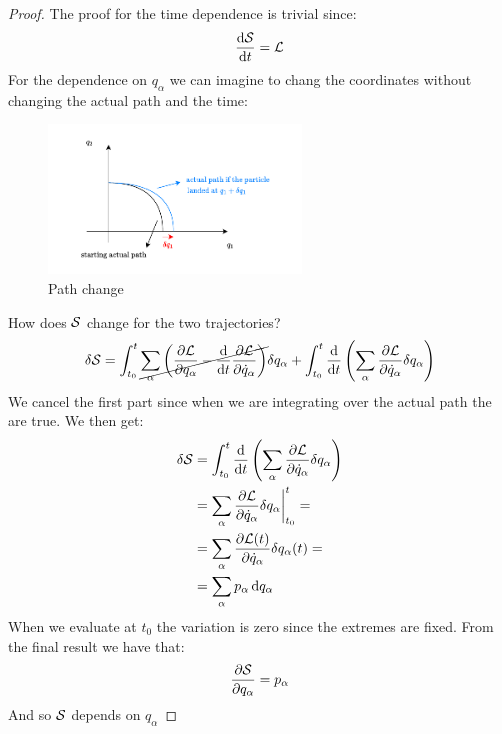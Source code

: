 \begin{proof}
  The proof for the time dependence is trivial since:
  \begin{equation}
    \dv{\action}{t} = \lagr
  \end{equation}
  For the dependence on $q_{\alpha}$ we can imagine to chang the coordinates without changing the actual path and the time:
  \begin{figure}[H]
    \centering
    \includegraphics[width=0.6\textwidth]{res/svg/path_change_hamjac.drawio}
    \caption{Path change}
\end{figure}
How does $\mathcal{S}$ change for the two trajectories?
\begin{equation}
  \delta \action = \int_{t_0}^{t}\cancel{\bigsum_{\alpha}\brackets{\pdv{\lagr}{q_{\alpha}}-\dv{}{t}\pdv{\lagr}{\dot{q}_{\alpha}}}}\delta q_{\alpha} + \int_{t_0}^{t} \dv{}{t} \brackets{\bigsum_{\alpha} \pdv{\lagr}{\dot{q}_{\alpha}}\delta q_{\alpha}}
\end{equation}
We cancel the first part since when we are integrating over the actual path the \eleref\;are true. We then get:
\begin{equation}
  \begin{split}
    \delta \action &= \int_{t_0}^{t}\dv{}{t}\brackets{\bigsum_{\alpha} \pdv{\lagr}{\dot{q}_{\alpha}}\delta q_{\alpha}}\\
    &= \bigsum_{\alpha} \pdv{\lagr}{\dot{q}_{\alpha}}\delta q_{\alpha}\bigg|_{t_0}^t =\\
    &= \bigsum_{\alpha} \pdv{\lagr(t)}{\dot{q}_{\alpha}}\delta q_{\alpha}(t) =\\
    &= \bigsum_{\alpha} p_{\alpha} \dd{q_{\alpha}}
  \end{split}
\end{equation}
When we evaluate at $t_0$ the variation is zero since the extremes are fixed. From the final result we have that:
\begin{equation}
  \pdv{\action}{q_{\alpha}} = p_{\alpha}
\end{equation}
And so $\mathcal{S}$ depends on $q_{\alpha}$
\end{proof}
